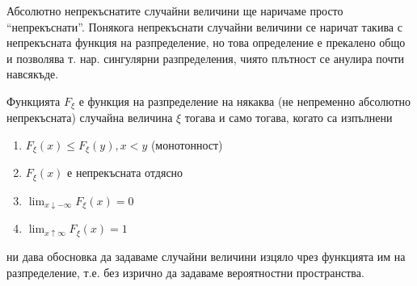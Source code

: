 \documentclass{../../common/topic}
\begin{document}
\begin{remark}
  Абсолютно непрекъснатите случайни величини ще наричаме просто \enquote{непрекъснати}. Понякога непрекъснати случайни величини се наричат такива с непрекъсната функция на разпределение, но това определение е прекалено общо и позволява т. нар. сингулярни разпределения, чиято плътност се анулира почти навсякъде.
\end{remark}

\begin{proposition}\label{thm:cdf_properties}
  Функцията \( F_\xi \) е функция на разпределение на някаква (не непременно абсолютно непрекъсната) случайна величина \( \xi \) тогава и само тогава, когато са изпълнени
  \begin{enumerate}
    \item \( F_\xi(x) \leq F_\xi(y), x < y \) (монотонност)
    \item \( F_\xi(x) \) е непрекъсната отдясно
    \item \( \lim_{x \downarrow -\infty} F_\xi(x) = 0 \)
    \item \( \lim_{x \uparrow \infty} F_\xi(x) = 1 \)
  \end{enumerate}
\end{proposition}

 ни дава обосновка да задаваме случайни величини изцяло чрез функцията им на разпределение, т.е. без изрично да задаваме вероятностни пространства.
\end{document}
